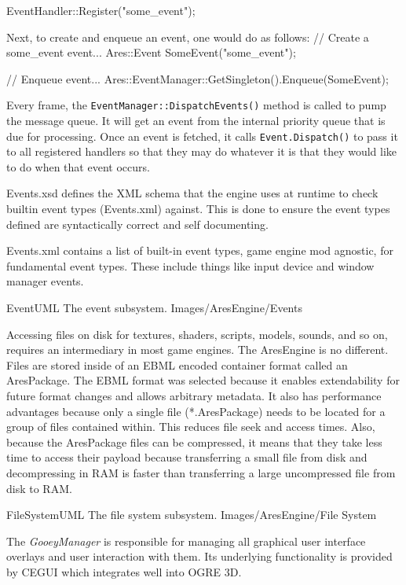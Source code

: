 \StartCodeExample
EventHandler::Register("some_event");
\StopCodeExample

Next, to create and enqueue an event, one would do as follows:
\StartCodeExample
\starttyping
// Create a some_event event...
Ares::Event SomeEvent("some_event");

// Enqueue event...
Ares::EventManager::GetSingleton().Enqueue(SomeEvent);
\stoptyping
\StopCodeExample

Every frame, the {\tt EventManager::DispatchEvents()} method is called to pump the message queue. It will get an event from the internal priority queue that is due for processing. Once an event is fetched, it calls {\tt Event.Dispatch()} to pass it to all registered handlers so that they may do whatever it is that they would like to do when that event occurs.

Events.xsd defines the XML schema that the engine uses at runtime to check builtin event types (Events.xml) against. This is done to ensure the event types defined are syntactically correct and self documenting.

Events.xml contains a list of built-in event types, game engine mod agnostic, for fundamental event types. These include things like input device and window manager events.

\FullPageLandscapeDiagram
    {EventUML}
    {The event subsystem.}
    {Images/AresEngine/Events}

\page 
{}
Accessing files on disk for textures, shaders, scripts, models, sounds, and so on, requires an intermediary in most game engines. The AresEngine is no different. Files are stored inside of an EBML encoded container format called an AresPackage. The EBML format was selected because it enables extendability for future format changes and allows arbitrary metadata. It also has performance advantages because only a single file (*.AresPackage) needs to be located for a group of files contained within. This reduces file seek and access times. Also, because the AresPackage files can be compressed, it means that they take less time to access their payload because transferring a small file from disk and decompressing in RAM is faster than transferring a large uncompressed file from disk to RAM.

\FullPageLandscapeDiagram
    {FileSystemUML}
    {The file system subsystem.}
    {Images/AresEngine/File System}

\page 
{}
The {\it GooeyManager} is responsible for managing all graphical user interface overlays and user interaction with them. Its underlying functionality is provided by CEGUI which integrates well into OGRE 3D.

